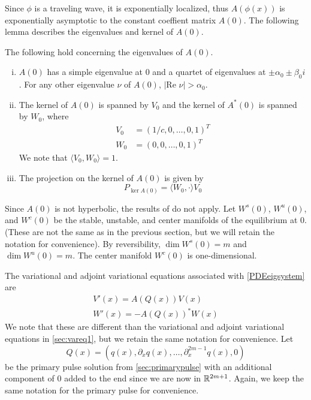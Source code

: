 \documentclass[thesis.tex]{subfiles}
\begin{document}
Since $\phi$ is a traveling wave, it is exponentially localized, thus $A(\phi(x))$ is exponentially asymptotic to the constant coeffient matrix $A(0)$. The following lemma describes the eigenvalues and kernel of $A(0)$.

\begin{lemma}\label{eigA0lemma}
The following hold concerning the eigenvalues of $A(0)$.
\begin{enumerate}[(i)]
\item $A(0)$ has a simple eigenvalue at 0 and a quartet of eigenvalues at $\pm \alpha_0 \pm \beta_0 i$. For any other eigenvalue $\nu$ of $A(0)$, $|\text{Re }\nu| > \alpha_0$.
\item The kernel of $A(0)$ is spanned by $V_0$ and the kernel of $A^*(0)$ is spanned by $W_0$, where
\begin{align}
V_0 &= (1/c, 0, \dots, 0, 1)^T \\
W_0 &= (0, 0, \dots, 0, 1)^T
\end{align}
We note that $\langle V_0, W_0 \rangle = 1$.
\item The projection on the kernel of $A(0)$ is given by
\begin{equation}\label{projkernelA0}
P_{\ker A(0)} = \langle W_0, \cdot \rangle V_0
\end{equation}
\end{enumerate} 
\end{lemma}

Since $A(0)$ is not hyperbolic, the results of \cite{Sandstede1998} do not apply. Let $W^s(0)$, $W^u(0)$, and $W^c(0)$ be the stable, unstable, and center manifolds of the equilibrium at 0. (These are not the same as in the previous section, but we will retain the notation for convenience). By reversibility, $\dim W^s(0) = m$ and $\dim W^u(0) = m$. The center manifold $W^c(0)$ is one-dimensional.

The variational and adjoint variational equations associated with \cref{PDEeigsystem} are
\begin{align}
V'(x) = A(Q(x)) V(x) \label{vareq2} \\
W'(x) = -A(Q(x))^* W(x) \label{adjvareq2}
\end{align}
We note that these are different than the variational and adjoint variational equations in \cref{sec:vareq1}, but we retain the same notation for convenience. Let 
\[
Q(x) = (q(x), \partial_x q(x), \dots, \partial_x^{2m-1} q(x), 0)\]
be the primary pulse solution from \cref{sec:primarypulse} with an additional component of 0 added to the end since we are now in $\mathbb{R}^{2m+1}$. Again, we keep the same notation for the primary pulse for convenience. 
\end{document}
